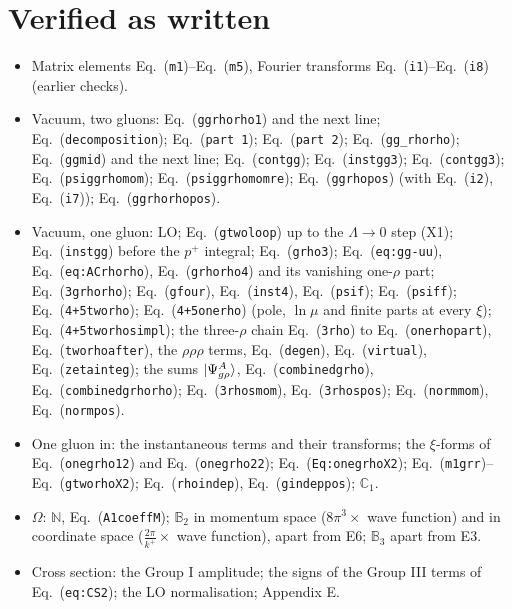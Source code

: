 \documentclass[10pt]{article}
\def\mf#1{\mathbb{#1}}
\newcommand{\eqn}[1]{Eq.~(\texttt{#1})}
\begin{document}
\section{Verified as written}
\begin{itemize}\sloppy
\item Matrix elements \eqn{m1}--\eqn{m5}, Fourier transforms \eqn{i1}--\eqn{i8} (earlier checks).
\item Vacuum, two gluons: \eqn{ggrhorho1} and the next line; \eqn{decomposition}; \eqn{part 1}; \eqn{part 2}; \eqn{gg\_rhorho}; \eqn{ggmid} and the next line; \eqn{contgg}; \eqn{instgg3}; \eqn{contgg3}; \eqn{psiggrhomom}; \eqn{psiggrhomomre}; \eqn{ggrhopos} (with \eqn{i2}, \eqn{i7}); \eqn{ggrhorhopos}.
\item Vacuum, one gluon: LO; \eqn{gtwoloop} up to the $\Lambda\to0$ step (X1); \eqn{instgg} before the $p^+$ integral; \eqn{grho3}; \eqn{eq:gg-uu}, \eqn{eq:ACrhorho}, \eqn{grhorho4} and its vanishing one-$\rho$ part; \eqn{3grhorho}; \eqn{gfour}, \eqn{inst4}, \eqn{psif}; \eqn{psiff}; \eqn{4+5tworho}; \eqn{4+5onerho} (pole, $\ln\mu$ and finite parts at every $\xi$); \eqn{4+5tworhosimpl}; the three-$\rho$ chain \eqn{3rho} to \eqn{onerhopart}, \eqn{tworhoafter}, the $\rho\rho\rho$ terms, \eqn{degen}, \eqn{virtual}, \eqn{zetainteg}; the sums $\ket{\Psi^A_{g\rho}}$, \eqn{combinedgrho}, \eqn{combinedgrhorho}; \eqn{3rhosmom}, \eqn{3rhospos}; \eqn{normmom}, \eqn{normpos}.
\item One gluon in: the instantaneous terms and their transforms; the $\xi$-forms of \eqn{onegrho12} and \eqn{onegrho22}; \eqn{Eq:onegrhoX2}; \eqn{m1grr}--\eqn{gtworhoX2}; \eqn{rhoindep}, \eqn{gindeppos}; $\mf C_1$.
\item $\Omega$: $\mf N$, \eqn{A1coeffM}; $\mf B_2$ in momentum space ($8\pi^3\times$ wave function) and in coordinate space ($\frac{2\pi}{k^+}\times$ wave function), apart from E6; $\mf B_3$ apart from E3.
\item Cross section: the Group I amplitude; the signs of the Group III terms of \eqn{eq:CS2}; the LO normalisation; Appendix E.
\end{itemize}

\end{document}
